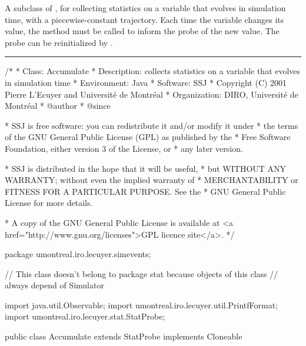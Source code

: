 
A subclass of ,
for collecting statistics on a
variable that evolves in simulation time, with a piecewise-constant trajectory.
Each time the variable changes its value, the method 
must be called to inform the probe of the new value.
The probe can be reinitialized by .

\bigskip\hrule

\begin{code}
\begin{hide}
/*
 * Class:        Accumulate
 * Description:  collects statistics on a variable that evolves in
                 simulation time
 * Environment:  Java
 * Software:     SSJ 
 * Copyright (C) 2001  Pierre L'Ecuyer and Université de Montréal
 * Organization: DIRO, Université de Montréal
 * @author       
 * @since

 * SSJ is free software: you can redistribute it and/or modify it under
 * the terms of the GNU General Public License (GPL) as published by the
 * Free Software Foundation, either version 3 of the License, or
 * any later version.

 * SSJ is distributed in the hope that it will be useful,
 * but WITHOUT ANY WARRANTY; without even the implied warranty of
 * MERCHANTABILITY or FITNESS FOR A PARTICULAR PURPOSE.  See the
 * GNU General Public License for more details.

 * A copy of the GNU General Public License is available at
   <a href="http://www.gnu.org/licenses">GPL licence site</a>.
 */
\end{hide}
package umontreal.iro.lecuyer.simevents;\begin{hide}
// This class doesn't belong to package stat because objects of this class
// always depend of Simulator

import java.util.Observable;
import umontreal.iro.lecuyer.util.PrintfFormat;
import umontreal.iro.lecuyer.stat.StatProbe;
\end{hide}

public class Accumulate extends StatProbe implements Cloneable \begin{hide} {

   private double initTime;    // Initialization time.
   private double lastTime;    // Last update time.
   private double lastValue;   // Value since last update.
   private Simulator sim;
\end{hide}
\end{code}


